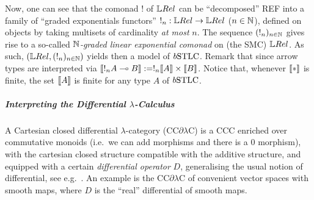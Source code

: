 Now, one can see that the comonad $!$ of $\LREL$ can be ``decomposed'' {\color{red}REF} into a family of ``graded exponentials functors'' $!_n:\LREL\to\LREL$ ($n\in\mathbb{N}$), defined on objects by taking multisets of cardinality \emph{at most} $n$. %
The sequence $(!_n)_{n\in\mathbb{N}}$ gives rise to a so-called \emph{$\mathbb{N}$-graded linear exponential comonad} on (the SMC) $\LREL$. %
As such, $(\LREL,(!_n)_{n\in\N})$ yields then a model of $\BSTLC$. Remark that since arrow types are interpreted via $\llbracket!_{n}A\multimap B\rrbracket:= !_{n}\llbracket A\rrbracket \times \llbracket B\rrbracket$. Notice that, whenever $\llbracket*\rrbracket$ is finite, the set $\llbracket A\rrbracket$ is finite for any type $A$ of $\BSTLC$.


\subparagraph*{Interpreting the Differential $\lambda$-Calculus}\label{sec:STDLC}

A Cartesian closed differential $\lambda$-category (CC$\partial\lambda$C)\cite{Manzo2010,Blute2009, Blute2019} is a CCC enriched over commutative monoids (i.e.\ we can add morphisms and there is a $0$ morphism), with the cartesian closed structure compatible with the additive structure, 
and equipped with a certain \emph{differential operator} $D$, generalising the usual notion of differential, see e.g.\ \cite{BluteEhrhTass10}.
An example is the CC$\partial\lambda$C of convenient vector spaces with smooth maps, where $D$ is the ``real'' differential of smooth maps.

